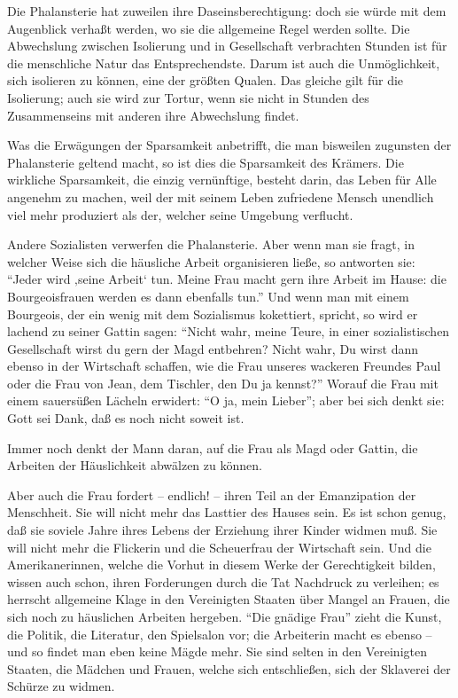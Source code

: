 \documentclass{scrbook}
\begin{document}
Die Phalansterie hat zuweilen ihre Daseinsberechtigung: doch sie würde mit dem Augenblick verhaßt werden, wo sie die allgemeine Regel werden sollte. Die Abwechslung zwischen Isolierung und in Gesellschaft verbrachten Stunden ist für die menschliche Natur das Entsprechendste. Darum ist auch die Unmöglichkeit, sich isolieren zu können, eine der größten Qualen. Das gleiche gilt für die Isolierung; auch sie wird zur Tortur, wenn sie nicht in Stunden des Zusammenseins mit anderen ihre Abwechslung findet.

Was die Erwägungen der Sparsamkeit anbetrifft, die man bisweilen zugunsten der Phalansterie geltend macht, so ist dies die Sparsamkeit des Krämers. Die wirkliche Sparsamkeit, die einzig vernünftige, besteht darin, das Leben für Alle angenehm zu machen, weil der mit seinem Leben zufriedene Mensch unendlich viel mehr produziert als der, welcher seine Umgebung verflucht.

Andere Sozialisten verwerfen die Phalansterie. Aber wenn man sie fragt, in welcher Weise sich die häusliche Arbeit organisieren ließe, so antworten sie: ``Jeder wird ‚seine Arbeit‘ tun. Meine Frau macht gern ihre Arbeit im Hause: die Bourgeoisfrauen werden es dann ebenfalls tun.'' Und wenn man mit einem Bourgeois, der ein wenig mit dem Sozialismus kokettiert, spricht, so wird er lachend zu seiner Gattin sagen: ``Nicht wahr, meine Teure, in einer sozialistischen Gesellschaft wirst du gern der Magd entbehren? Nicht wahr, Du wirst dann ebenso in der Wirtschaft schaffen, wie die Frau unseres wackeren Freundes Paul oder die Frau von Jean, dem Tischler, den Du ja kennst?'' Worauf die Frau mit einem sauersüßen Lächeln erwidert: ``O ja, mein Lieber''; aber bei sich denkt sie: Gott sei Dank, daß es noch nicht soweit ist.

Immer noch denkt der Mann daran, auf die Frau als Magd oder Gattin, die Arbeiten der Häuslichkeit abwälzen zu können.

Aber auch die Frau fordert – endlich! – ihren Teil an der Emanzipation der Menschheit. Sie will nicht mehr das Lasttier des Hauses sein. Es ist schon genug, daß sie soviele Jahre ihres Lebens der Erziehung ihrer Kinder widmen muß. Sie will nicht mehr die Flickerin und die Scheuerfrau der Wirtschaft sein. Und die Amerikanerinnen, welche die Vorhut in diesem Werke der Gerechtigkeit bilden, wissen auch schon, ihren Forderungen durch die Tat Nachdruck zu verleihen; es herrscht allgemeine Klage in den Vereinigten Staaten über Mangel an Frauen, die sich noch zu häuslichen Arbeiten hergeben. ``Die gnädige Frau'' zieht die Kunst, die Politik, die Literatur, den Spielsalon vor; die Arbeiterin macht es ebenso – und so findet man eben keine Mägde mehr. Sie sind selten in den Vereinigten Staaten, die Mädchen und Frauen, welche sich entschließen, sich der Sklaverei der Schürze zu widmen.
\end{document}
